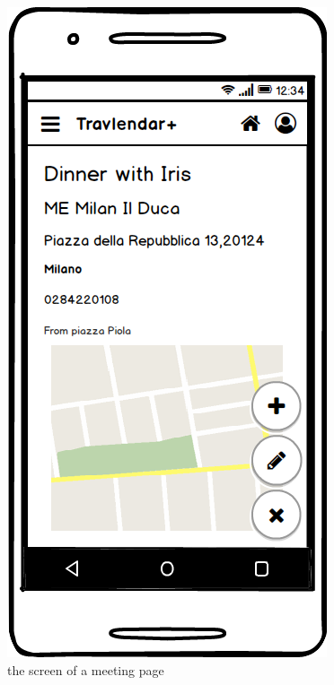 \documentclass[11pt]{article}
\begin{document}
	\begin{figure}
	\centering
	\includegraphics[width=0.7\linewidth]{MeetingView.png}
	\caption{the screen of a meeting page}
	\label{fig:meeting-view}
	\end{figure}
\end{document}
